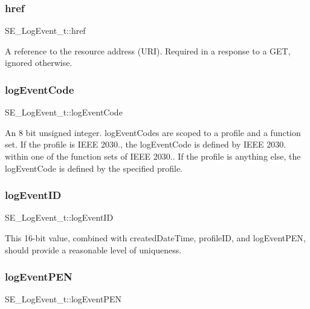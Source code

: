 \subsubsection{\texorpdfstring{href}{href}}
{\footnotesize\ttfamily S\+E\+\_\+\+Log\+Event\+\_\+t\+::href}

A reference to the resource address (U\+RI). Required in a response to a G\+ET, ignored otherwise. \mbox{\label{group__LogEvent_ga94b54840b21fa653aa8a15407470e017}} 
\subsubsection{\texorpdfstring{log\+Event\+Code}{logEventCode}}
{\footnotesize\ttfamily S\+E\+\_\+\+Log\+Event\+\_\+t\+::log\+Event\+Code}

An 8 bit unsigned integer. log\+Event\+Codes are scoped to a profile and a function set. If the profile is I\+E\+EE 2030., the log\+Event\+Code is defined by I\+E\+EE 2030. within one of the function sets of I\+E\+EE 2030.. If the profile is anything else, the log\+Event\+Code is defined by the specified profile. \mbox{\label{group__LogEvent_ga88d7a251a6ed7939d961c7bc7e9071f4}} 
\subsubsection{\texorpdfstring{log\+Event\+ID}{logEventID}}
{\footnotesize\ttfamily S\+E\+\_\+\+Log\+Event\+\_\+t\+::log\+Event\+ID}

This 16-\/bit value, combined with created\+Date\+Time, profile\+ID, and log\+Event\+P\+EN, should provide a reasonable level of uniqueness. \mbox{\label{group__LogEvent_ga3b9a19af528c15c42d19845194d6d859}} 
\subsubsection{\texorpdfstring{log\+Event\+P\+EN}{logEventPEN}}
{\footnotesize\ttfamily S\+E\+\_\+\+Log\+Event\+\_\+t\+::log\+Event\+P\+EN}

